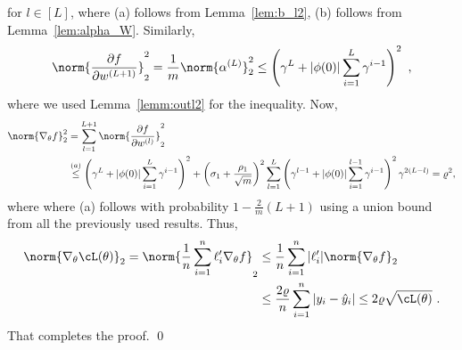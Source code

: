 for $l\in[L]$, where (a) follows from Lemma~\ref{lem:b_l2}, (b) follows from Lemma~\ref{lem:alpha_W}. Similarly,
$$
\norm{\frac{\partial f}{\partial w^{(L+1)}}}_2^2 = \frac{1}{m}\norm{\alpha^{(L)}}_2^2 \leq \left( \gamma^{L} + |\phi(0)| \sum_{i=1}^{L} \gamma^{i-1} \right)^2~,
$$
where we used Lemma~\ref{lemm:outl2} for the inequality.
Now,
\begin{align*}
\norm{\nabla_\theta f}_2^2&=\sum_{l=1}^{L+1}\norm{\frac{\partial f}{\partial w^{(l)}}}^2_2 \\
&\overset{(a)}{\leq}
\left(\gamma^{L} + |\phi(0)| \sum_{i=1}^{L} \gamma^{i-1} \right)^2+\left(\sigma_1+\frac{\rho_1}{\sqrt{m}}\right)^2\sum_{l=1}^{L}\left( \gamma^{l-1} + |\phi(0)| \sum_{i=1}^{l-1} \gamma^{i-1} \right)^2\gamma^{2(L-l)}=\varrho^2,
\end{align*}
where where (a) follows with probability $1-\frac{2}{m}(L+1)$ using a union bound from all the previously used results. Thus,
\begin{align*}
\norm{\nabla_\theta\cL(\theta)}_2=\norm{\frac{1}{n}\sum^n_{i=1}\ell_i'\nabla_\theta f}_2&\leq \frac{1}{n}\sum_{i=1}^n|\ell_i'|\norm{\nabla_\theta f}_2\\
&\leq \frac{2\varrho}{n}\sum^n_{i=1}|y_i-\hat{y}_i|\leq 2\varrho\sqrt{\cL(\theta)}~.
\end{align*}
That completes the proof. \qed


